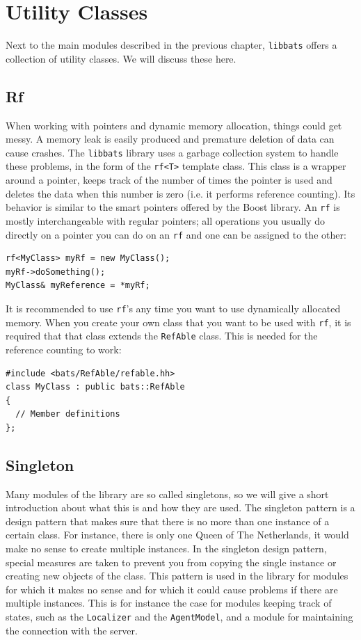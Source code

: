 \chapter{Utility Classes}

Next to the main modules described in the previous chapter, {\tt libbats} offers a collection of utility classes. We will discuss these here.

\lstset{numbers=none}

\section{Rf}
\label{secRf}

When working with pointers and dynamic memory allocation, things could get messy. A memory leak is easily produced and premature deletion of data can cause crashes. The {\tt libbats} library uses a garbage collection system to handle these problems, in the form of the {\tt rf<T>} template class. This class is a wrapper around a pointer, keeps track of the number of times the pointer is used and deletes the data when this number is zero (i.e. it performs reference counting). Its behavior is similar to the smart pointers offered by the Boost library. An {\tt rf} is mostly interchangeable with regular pointers; all operations you usually do directly on a pointer you can do on an {\tt rf} and one can be assigned to the other:
\begin{lstlisting}[frame=single]
rf<MyClass> myRf = new MyClass();
myRf->doSomething();
MyClass& myReference = *myRf;
\end{lstlisting}

It is recommended to use {\tt rf}'s any time you want to use dynamically allocated memory. When you create your own class that you want to be used with {\tt rf}, it is required that that class extends the {\tt RefAble} class. This is needed for the reference counting to work:
\begin{lstlisting}[frame=single]
#include <bats/RefAble/refable.hh>
class MyClass : public bats::RefAble
{
  // Member definitions
};
\end{lstlisting}

\section{Singleton}
\label{secSingleton}

Many modules of the library are so called singletons, so we will give a short introduction about what this is and how they are used. The singleton pattern is a design pattern that makes sure that there is no more than one instance of a certain class. For instance, there is only one Queen of The Netherlands, it would make no sense to create multiple instances. In the singleton design pattern, special measures are taken to prevent you from copying the single instance or creating new objects of the class. This pattern is used in the library for modules for which it makes no sense and for which it could cause problems if there are multiple instances. This is for instance the case for modules keeping track of states, such as the {\tt Localizer} and the {\tt AgentModel}, and a module for maintaining the connection with the server.

